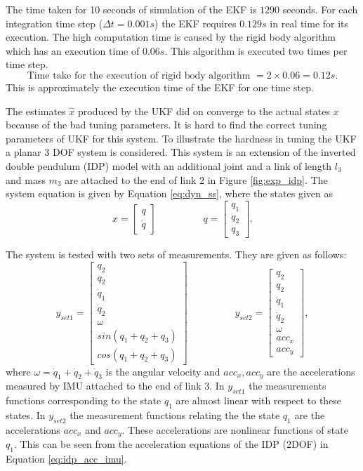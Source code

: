 The time taken for 10 seconds of simulation of the EKF is $1290$ seconds. For each integration time step ($\Delta t = 0.001 s$) the EKF requires $0.129 s$ in real time for its execution. The high computation time is caused by the rigid body algorithm which has an execution time of $0.06s$. This algorithm is executed two times per time step.
$$ \text{Time take for the execution of rigid body algorithm } = 2 \times 0.06 = 0.12 s.$$ This is approximately the execution time of the EKF for one time step.

The estimates $\hat x$ produced by the UKF did on converge to the actual states $x$ because of the bad tuning parameters. It is hard to find the correct tuning parameters of UKF for this system. To illustrate the hardness in tuning the UKF a planar 3 DOF system is considered. This system is an extension of the inverted double pendulum (IDP) model with an additional joint and a link of length $l_3$ and mass $m_3$ are attached to the end of link 2 in Figure \ref{fig:exp_idp}. 
The system equation is given by Equation \ref{eq:dyn_ss}, where the states given as 
$$x=\begin{bmatrix}q \\ \dot{q}\end{bmatrix}\hspace{2cm} q=\begin{bmatrix} q_1 \\ q_2 \\ q_3 \end{bmatrix}.$$

The system is tested with two sets of measurements. They are given as follows:
$$y_{set1} = \begin{bmatrix} q_2 \\ q_2 \\ \dot q_1 \\ \dot q_2 \\ \omega \\ sin(q_1+q_2+q_3) \\ cos(q_1+q_2+q_3)  \end{bmatrix}
\hspace{2cm} y_{set2}= \begin{bmatrix}
q_2 \\ q_2 \\ \dot q_1 \\ \dot q_2 \\ \omega \\ acc_x \\ acc_y \end{bmatrix},
 $$
where $\omega = \dot q_1 + \dot q_2 + \dot q_3$ is the angular velocity and $acc_x, acc_y $ are the accelerations measured by IMU attached to the end of link 3. In $y_{set1}$ the measurements functions corresponding to the state $q_1$ are almost linear with respect to these states. In $y_{set2}$ the measurement functions relating the the state $q_1$ are the accelerations ${acc}_x$ and ${acc}_y$. These accelerations are nonlinear functions of state $q_1$. This can be seen from the acceleration equations of the IDP (2DOF) in Equation \ref{eq:idp_acc_imu}.

